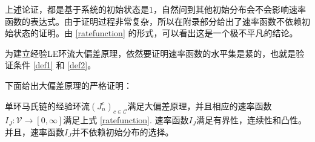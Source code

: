 上述论证，都是基于系统的初始状态是$1$，自然问到其他初始分布会不会影响速率函数的表达式。由于证明过程非常复杂，所以在附录部分给出了速率函数不依赖初始状态的证明。由 \eqref{ratefunction} 的形式，可以看出这是一个极不平凡的结论。

为建立经验LE环流大偏差原理，依然要证明速率函数的水平集是紧的，也就是验证条件 \eqref{def1} 和 \eqref{def2}。

下面给出大偏差原理的严格证明：
\begin{theorem}\label{thm:LDP}
    单环马氏链的经验环流$(J^c_n)_{c\in\mathcal{C}}$满足大偏差原理，并且相应的速率函数$I_J:\mathcal{V}\to [0,\infty]$满足上式 \eqref{ratefunction}. 速率函数$I_J$满足有界性，连续性和凸性。并且，速率函数$I_J$并不依赖初始分布的选择。
\end{theorem}


